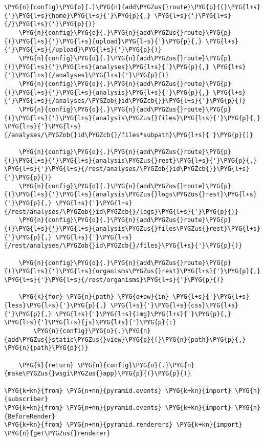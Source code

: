 \begin{Verbatim}[commandchars=\\\{\}]
    \PYG{n}{config}\PYG{o}{.}\PYG{n}{add\PYGZus{}route}\PYG{p}{(}\PYG{l+s}{'}\PYG{l+s}{home}\PYG{l+s}{'}\PYG{p}{,} \PYG{l+s}{'}\PYG{l+s}{/}\PYG{l+s}{'}\PYG{p}{)}
    \PYG{n}{config}\PYG{o}{.}\PYG{n}{add\PYGZus{}route}\PYG{p}{(}\PYG{l+s}{'}\PYG{l+s}{upload}\PYG{l+s}{'}\PYG{p}{,} \PYG{l+s}{'}\PYG{l+s}{/upload}\PYG{l+s}{'}\PYG{p}{)}
    \PYG{n}{config}\PYG{o}{.}\PYG{n}{add\PYGZus{}route}\PYG{p}{(}\PYG{l+s}{'}\PYG{l+s}{analyses}\PYG{l+s}{'}\PYG{p}{,} \PYG{l+s}{'}\PYG{l+s}{/analyses}\PYG{l+s}{'}\PYG{p}{)}
    \PYG{n}{config}\PYG{o}{.}\PYG{n}{add\PYGZus{}route}\PYG{p}{(}\PYG{l+s}{'}\PYG{l+s}{analysis}\PYG{l+s}{'}\PYG{p}{,} \PYG{l+s}{'}\PYG{l+s}{/analyses/\PYGZob{}id\PYGZcb{}}\PYG{l+s}{'}\PYG{p}{)}
    \PYG{n}{config}\PYG{o}{.}\PYG{n}{add\PYGZus{}route}\PYG{p}{(}\PYG{l+s}{'}\PYG{l+s}{analysis\PYGZus{}files}\PYG{l+s}{'}\PYG{p}{,} \PYG{l+s}{'}\PYG{l+s}{/analyses/\PYGZob{}id\PYGZcb{}/files*subpath}\PYG{l+s}{'}\PYG{p}{)}

    \PYG{n}{config}\PYG{o}{.}\PYG{n}{add\PYGZus{}route}\PYG{p}{(}\PYG{l+s}{'}\PYG{l+s}{analysis\PYGZus{}rest}\PYG{l+s}{'}\PYG{p}{,} \PYG{l+s}{'}\PYG{l+s}{/rest/analyses/\PYGZob{}id\PYGZcb{}}\PYG{l+s}{'}\PYG{p}{)}
    \PYG{n}{config}\PYG{o}{.}\PYG{n}{add\PYGZus{}route}\PYG{p}{(}\PYG{l+s}{'}\PYG{l+s}{analysis\PYGZus{}logs\PYGZus{}rest}\PYG{l+s}{'}\PYG{p}{,} \PYG{l+s}{'}\PYG{l+s}{/rest/analyses/\PYGZob{}id\PYGZcb{}/logs}\PYG{l+s}{'}\PYG{p}{)}
    \PYG{n}{config}\PYG{o}{.}\PYG{n}{add\PYGZus{}route}\PYG{p}{(}\PYG{l+s}{'}\PYG{l+s}{analysis\PYGZus{}files\PYGZus{}rest}\PYG{l+s}{'}\PYG{p}{,} \PYG{l+s}{'}\PYG{l+s}{/rest/analyses/\PYGZob{}id\PYGZcb{}/files}\PYG{l+s}{'}\PYG{p}{)}

    \PYG{n}{config}\PYG{o}{.}\PYG{n}{add\PYGZus{}route}\PYG{p}{(}\PYG{l+s}{'}\PYG{l+s}{organisms\PYGZus{}rest}\PYG{l+s}{'}\PYG{p}{,} \PYG{l+s}{'}\PYG{l+s}{/rest/organisms}\PYG{l+s}{'}\PYG{p}{)}

    \PYG{k}{for} \PYG{n}{path} \PYG{o+ow}{in} \PYG{l+s}{'}\PYG{l+s}{less}\PYG{l+s}{'}\PYG{p}{,} \PYG{l+s}{'}\PYG{l+s}{css}\PYG{l+s}{'}\PYG{p}{,} \PYG{l+s}{'}\PYG{l+s}{img}\PYG{l+s}{'}\PYG{p}{,} \PYG{l+s}{'}\PYG{l+s}{js}\PYG{l+s}{'}\PYG{p}{:}
        \PYG{n}{config}\PYG{o}{.}\PYG{n}{add\PYGZus{}static\PYGZus{}view}\PYG{p}{(}\PYG{n}{path}\PYG{p}{,} \PYG{n}{path}\PYG{p}{)}

    \PYG{k}{return} \PYG{n}{config}\PYG{o}{.}\PYG{n}{make\PYGZus{}wsgi\PYGZus{}app}\PYG{p}{(}\PYG{p}{)}

\PYG{k+kn}{from} \PYG{n+nn}{pyramid.events} \PYG{k+kn}{import} \PYG{n}{subscriber}
\PYG{k+kn}{from} \PYG{n+nn}{pyramid.events} \PYG{k+kn}{import} \PYG{n}{BeforeRender}
\PYG{k+kn}{from} \PYG{n+nn}{pyramid.renderers} \PYG{k+kn}{import} \PYG{n}{get\PYGZus{}renderer}


\end{Verbatim}
